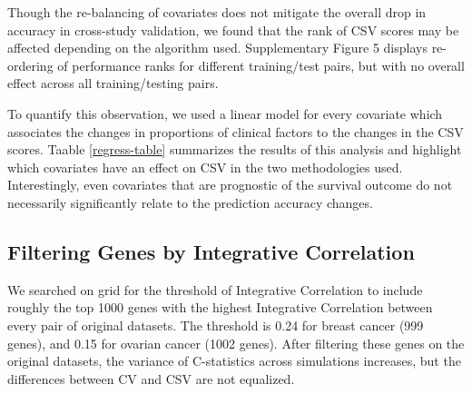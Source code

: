 \documentclass{bioinfo}
\begin{document}
  Though the re-balancing of covariates does not mitigate the overall drop in accuracy in cross-study
  validation, we found that the rank of CSV scores may be affected
  depending on the algorithm used. Supplementary Figure 5 displays 
  re-ordering of performance ranks for different training/test pairs,
  but with no overall effect across all training/testing pairs. 


To quantify this observation,
  we used a linear model for every covariate which associates the changes in proportions of 
  clinical factors to the changes in the CSV scores. Taable
  \ref{regress-table} summarizes the results of this analysis and highlight which covariates have an effect
on CSV in the two methodologies used. 
Interestingly, even covariates that are prognostic of the survival
outcome do not necessarily significantly relate
  to the prediction accuracy changes.
  	

 
  \subsection{Filtering Genes by Integrative Correlation}
  We searched on grid for the threshold of Integrative Correlation \citep{Parmigiani2004, Garrett-Mayer2008} to include roughly the top 1000 genes with the highest Integrative Correlation between every pair of original datasets. The threshold is 0.24 for breast cancer (999 genes), and 0.15 for ovarian cancer (1002 genes). After filtering these genes on the original datasets, the variance of C-statistics across simulations increases, but the differences between CV and CSV are not equalized. 
  
\end{document}
